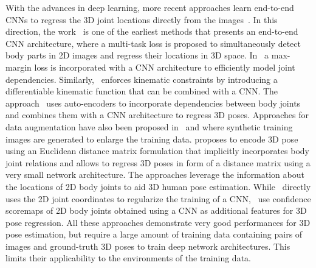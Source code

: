 \documentclass[10pt,journal,compsoc]{IEEEtran}
\begin{document}
With the advances in deep learning, more recent approaches learn end-to-end CNNs to regress 
the 3D joint locations directly from the images~\cite{LiC14, Sijin2015iccv,tekin2016structured, rogez2016mocap, chen20163dv,
zhou2016deep, Moreno_arxiv2016, parkECCV2016workshops, tekin2016fusing, popa2017CVPRmultitask}. In this direction, the work~\cite{LiC14} is 
one of the earliest methods that presents an end-to-end CNN architecture, where a multi-task loss 
is proposed to simultaneously detect body parts in 2D images and regress their locations in 3D space. In~\cite{Sijin2015iccv} a max-margin loss is 
incorporated with a CNN architecture to efficiently model joint dependencies. Similarly,~\cite{zhou2016deep} enforces kinematic constraints by introducing 
a differentiable kinematic function that can be combined with a CNN. The approach~\cite{tekin2016structured} uses auto-encoders to incorporate 
dependencies between body joints and combines them with a CNN architecture to regress 3D poses. Approaches for data augmentation 
have also been proposed in~\cite{rogez2016mocap} and \cite{chen20163dv} where synthetic training images are generated to enlarge the training data. 
\cite{Moreno_arxiv2016} proposes to encode 3D pose using an Euclidean distance matrix formulation that implicitly incorporates body joint 
relations and allows to regress 3D poses in form of a distance matrix using a very small network architecture. The approaches \cite{parkECCV2016workshops, tekin2016fusing, popa2017CVPRmultitask}
 leverage the information about the locations of 2D body joints to aid 3D human pose estimation. While~\cite{parkECCV2016workshops} directly uses the 
 2D joint coordinates to regularize the training of a CNN,~\cite{tekin2016fusing, popa2017CVPRmultitask} use confidence scoremaps of 2D body joints
 obtained using a CNN as additional features for 3D pose regression. All these approaches demonstrate very good performances for 3D pose 
estimation, but require a large amount of training data containing pairs of images and ground-truth 3D poses to train deep network architectures.
This limits their applicability to the environments of the training data.
\end{document}

